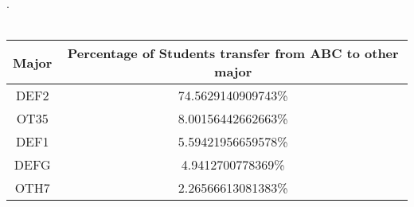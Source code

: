 . \\ \\

\begin{center}
\begin{tabular}{|c|c|}
\hline
Major & Percentage of Students transfer from  ABC to other major \\ \hline
DEF2    & 74.5629140909743\%                                      \\ \hline
OT35    & 8.00156442662663\%                                       \\ \hline
DEF1     & 5.59421956659578\%                                      \\ \hline
DEFG   & 4.9412700778369\%                                     \\ \hline
OTH7     &2.26566613081383\%                                      \\ \hline

\end{tabular}
\end{center}
